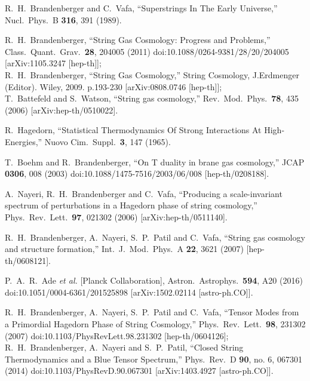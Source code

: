 \documentclass[prd, aps, superscriptaddress, preprintnumbers, twocolumn, floatfix, nofootinbib]{revtex4}
\begin{document}
\begin{thebibliography}{99}

R.~H.~Brandenberger and C.~Vafa,
``Superstrings In The Early Universe,''
Nucl.\ Phys.\ B {\bf 316}, 391 (1989).

R.~H.~Brandenberger, ``String Gas Cosmology: Progress
and Problems,'' Class.\ Quant.\ Grav.\  {\bf 28}, 204005 (2011)
doi:10.1088/0264-9381/28/20/204005 [arXiv:1105.3247 [hep-th]];\\
R.~H.~Brandenberger, ``String Gas Cosmology,'' String Cosmology,
J.Erdmenger (Editor).  Wiley, 2009. p.193-230 [arXiv:0808.0746
[hep-th]];\\ %
 T.~Battefeld and S.~Watson, ``String gas cosmology,'' Rev.\ Mod.\
 Phys.\  {\bf 78}, 435 (2006) [arXiv:hep-th/0510022]. %

R.~Hagedorn,
``Statistical Thermodynamics Of Strong Interactions At High-Energies,''
Nuovo Cim.\ Suppl.\  {\bf 3}, 147 (1965).

T.~Boehm and R.~Brandenberger,
  ``On T duality in brane gas cosmology,''
  JCAP {\bf 0306}, 008 (2003)
  doi:10.1088/1475-7516/2003/06/008
  [hep-th/0208188].

A.~Nayeri, R.~H.~Brandenberger and C.~Vafa,
``Producing a scale-invariant spectrum of perturbations in a Hagedorn phase of string
cosmology,''
Phys.\ Rev.\ Lett.\  {\bf 97}, 021302 (2006)
[arXiv:hep-th/0511140].

R.~H.~Brandenberger, A.~Nayeri, S.~P.~Patil and C.~Vafa,
``String gas cosmology and structure formation,''
Int.\ J.\ Mod.\ Phys.\ A {\bf 22}, 3621 (2007) [hep-th/0608121].

  P.~A.~R.~Ade {\it et al.} [Planck Collaboration],
  Astron.\ Astrophys.\  {\bf 594}, A20 (2016)
  doi:10.1051/0004-6361/201525898
  [arXiv:1502.02114 [astro-ph.CO]].

R.~H.~Brandenberger, A.~Nayeri, S.~P.~Patil and C.~Vafa,
  ``Tensor Modes from a Primordial Hagedorn Phase of String Cosmology,''
  Phys.\ Rev.\ Lett.\  {\bf 98}, 231302 (2007)
  doi:10.1103/PhysRevLett.98.231302
  [hep-th/0604126];\\
R.~H.~Brandenberger, A.~Nayeri and S.~P.~Patil,
  ``Closed String Thermodynamics and a Blue Tensor Spectrum,''
  Phys.\ Rev.\ D {\bf 90}, no. 6, 067301 (2014)
  doi:10.1103/PhysRevD.90.067301
  [arXiv:1403.4927 [astro-ph.CO]].


\end{thebibliography}
\end{document}
